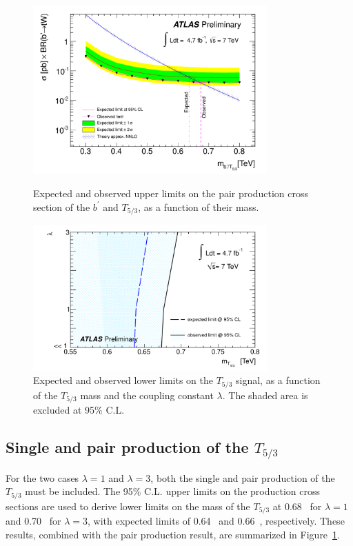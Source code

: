 \begin{figure}[t]  
  \begin{center}
    \includegraphics[width=0.8\textwidth]{figures/samesign/Limit_bprime_final_obs_CS}
    \caption{Expected and observed upper limits on the pair production cross section 
        of the $b^\prime$ and $T_{5/3}$, as a function of their mass.}
    \label{limit:bprime}

    \vspace{1cm}

    \includegraphics[width=0.8\textwidth]{figures/samesign/limit_observed_T53}
    \caption{Expected and observed lower limits on the $T_{5/3}$ signal, as a function 
        of the $T_{5/3}$ mass and the coupling constant $\lambda$. The shaded area  is excluded 
        at 95\% C.L.}
    \label{limit:t53}
  \end{center}
\end{figure}

\subsection{Single and pair production of the $T_{5/3}$}
For the two cases $\lambda=1$ and $\lambda=3$, both the single and pair production of the $T_{5/3}$
must be included. The 95\% C.L. upper limits on the production cross sections are used to
derive lower limits on the mass of the $T_{5/3}$ at 0.68~\TeV{} for $\lambda=1$ and 0.70~\TeV{} for
$\lambda=3$, with expected limits of 0.64~\TeV{} and 0.66~\TeV{}, respectively. These results, combined with
the pair production result, are summarized in Figure~\ref{limit:t53}.

